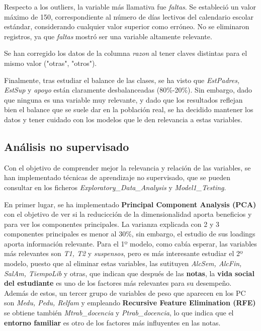 \documentclass{article}
\begin{document}
Respecto a los outliers, la variable más llamativa fue \textit{faltas}. Se estableció un valor máximo de 150, correspondiente al número de días lectivos del calendario escolar estándar, considerando 
cualquier valor superior como erróneo. No se eliminaron registros, ya que \textit{faltas} mostró ser una variable altamente relevante.


Se han corregido los datos de la columna \textit{razon} al tener claves distintas para el mismo valor ("otras", "otros").

Finalmente, tras estudiar el balance de las clases, se ha visto que \textit{EstPadres, EstSup} y \textit{apoyo} están claramente desbalanceadas (80\%-20\%). Sin embargo, dado que ninguna es una variable
muy relevante, y dado que los resultados reflejan bien el balance que se suele dar en la población real, se ha decidido mantener los datos y tener cuidado con los modelos que le den relevancia a estas variables.

\subsection{Análisis no supervisado}


Con el objetivo de comprender mejor la relevancia y relación de las variables, se han implementado técnicas de aprendizaje no supervisado, que se pueden consultar en los ficheros \textit{Exploratory\_Data\_Analysis} y \textit{Model1\_Testing}.

En primer lugar, se ha implementado \textbf{Principal Component Analysis (PCA)} con el objetivo de ver si la reducicción de la dimensionalidad aporta beneficios y para ver los componentes principales. 
La varianza explicada con 2 y 3 componentes principales es menor al 30\%, sin embargo, el estudio de sus loadings aporta información relevante. Para el 1º modelo, como cabía esperar, las variables
más relevantes son \textit{T1, T2} y \textit{suspensos}, pero es más interesante estudiar el 2º modelo, puesto que al eliminar estas variables, las sutituyen \textit{AlcSem, AlcFin, SalAm, TiempoLib} y otras, que
 indican que después de las \textbf{notas}, la \textbf{vida social del estudiante} es uno de los factores más relevantes para su desempeño. Además de estos, un tercer grupo de variables de peso que aparecen en los PC son \textit{Medu, Pedu, Relfam} y empleando \textbf{Recursive Feature Elimination (RFE)} 
se obtiene también \textit{Mtrab\_docencia} y \textit{Ptrab\_docencia}, lo que indica que el \textbf{entorno familiar} es otro de los factores más influyentes en las notas. 
\end{document}
